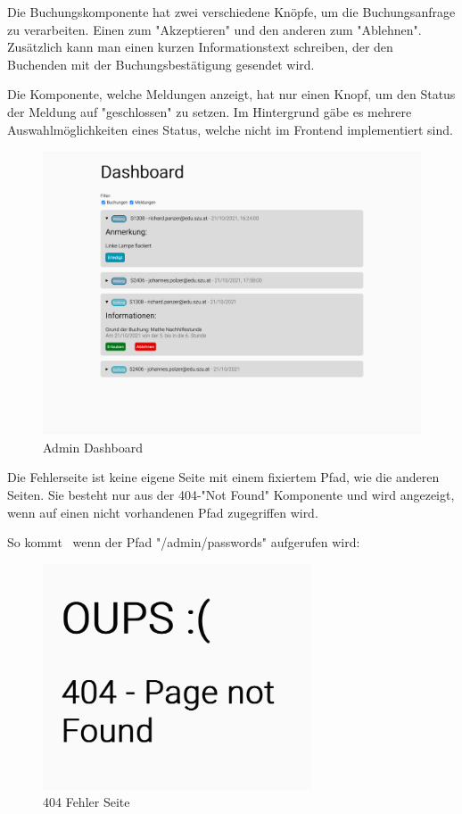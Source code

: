 Die Buchungskomponente hat zwei verschiedene Knöpfe, um die Buchungsanfrage zu verarbeiten. Einen zum "Akzeptieren" und den anderen zum "Ablehnen". Zusätzlich kann man einen kurzen Informationstext schreiben, der den Buchenden mit der Buchungsbestätigung gesendet wird. 

Die Komponente, welche Meldungen anzeigt, hat nur einen Knopf, um den Status der Meldung auf "geschlossen" zu setzen. Im Hintergrund gäbe es mehrere Auswahlmöglichkeiten eines Status, welche nicht im Frontend implementiert sind.

\begin{figure}[H]
    \centering
    \includegraphics[width=120mm]{media/WebComponents/AdminSeite_light.png}
    \caption{Admin Dashboard}
    \label{fig:admindashboard}
\end{figure}

\begin{minipage}{\textwidth}
    
    Die Fehlerseite ist keine eigene Seite mit einem fixiertem Pfad, wie die anderen Seiten. Sie besteht nur aus der 404-"Not Found" Komponente und wird angezeigt, wenn auf einen nicht vorhandenen Pfad zugegriffen wird. 
\end{minipage}

So kommt \zb\ wenn der Pfad "{\ttfamily /admin/passwords}" aufgerufen wird:
    
\begin{figure}[H]
    \centering
    \includegraphics[width=80mm]{media/WebComponents/404.png}
    \caption{404 Fehler Seite}
\end{figure}